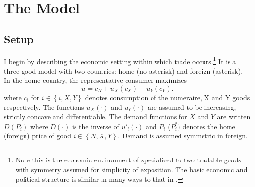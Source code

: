 \documentclass[12pt]{article}
\begin{document}
%

\section{The Model}
\label{sec:stage}

\subsection{Setup}
\label{sec:economic}
I begin by describing the economic setting within which trade occurs.\footnote{Note this is the economic environment of \Textcite{gh95} specialized to two tradable goods with symmetry assumed for simplicity of exposition. The basic economic and political structure is similar in many ways to that in \Textcite{buzard2013b}.} It is a three-good model with two countries: home (no asterisk) and foreign (asterisk). In the home country, the representative consumer maximizes
\[
  u = c_N + u_X(c_X) + u_Y(c_Y).
\]
where $c_i$ for $i \in \left\{i,X,Y\right\}$ denotes consumption of the numeraire, X and Y goods respectively. The functions $u_X(\cdot)$ and $u_Y(\cdot)$ are assumed to be increasing, strictly concave and differentiable. The demand functions for $X$ and $Y$ are written $D(P_i)$ where $D(\cdot)$ is the inverse of $u'_i(\cdot)$ and $P_i$ ($P_i^*$) denotes the home (foreign) price of good $i \in \left\{N,X,Y\right\}$. Demand is assumed symmetric in foreign.
\end{document}
